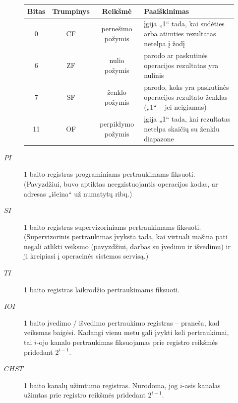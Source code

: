 \begin{description}
\begin{description}
        \begin{tabularx}{0.85\textwidth}{|c|c|c|X|}
          \hline
          Bitas & Trumpinys & Reikšmė & Paaiškinimas %
          \\
          \hline
          0 & CF & pernešimo požymis & įgija „1“ tada, kai sudėties arba
          atimties rezultatas netelpa į žodį 
          \\
          \hline
          6 & ZF & nulio požymis & parodo ar paskutinės operacijos 
          rezultatas yra nulinis %
          \\
          \hline
          7 & SF & ženklo požymis & parodo, koks yra paskutinės operacijos 
          rezultato ženklas („1“ – jei neigiamas) 
          \\
          \hline
          11 & OF & perpildymo požymis & įgija „1“ tada, kai rezultatas
          netelpa skaičių su ženklu diapazone 
          \\
          \hline
        \end{tabularx}
      \item[$PI$] 1 baito registras programiniams pertraukimams fiksuoti.
        (Pavyzdžiui, buvo aptiktas neegzistuojantis operacijos kodas, ar
        adresas „išeina“ už numatytų ribų.)
      \item[$SI$] 1 baito registras supervizoriniams pertraukimams fiksuoti.
        (Supervizorinis pertraukimas įvyksta tada, kai virtuali mašina
        pati negali atlikti veiksmo (pavyzdžiui, darbas su įvedimu ir
        išvedimu) ir ji kreipiasi į operacinės sistemos servisą.)
      \item[$TI$] 1 baito registras laikrodžio pertraukimams fiksuoti.
      \item[$IOI$] 1 baito įvedimo / išvedimo pertraukimo registras – 
        praneša, kad veiksmas baigėsi. Kadangi vienu 
        metu gali įvykti keli pertraukimai, tai $i$-ojo kanalo pertraukimas
        fiksuojamas prie registro reikšmės pridedant $2^{i-1}$.
      \item[$CHST$] 1 baito kanalų užimtumo registras. Nurodoma, jog
        $i$-asis kanalas užimtas prie registro reikšmės pridedant 
        $2^{i-1}$.
    \end{description}


\end{description}
